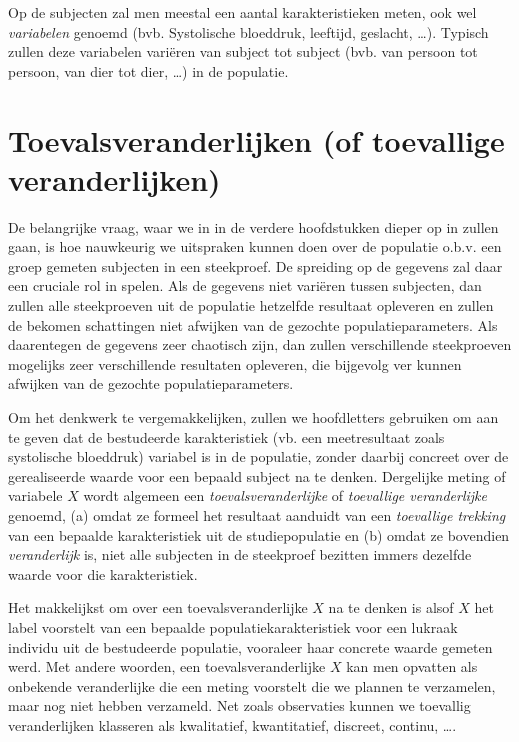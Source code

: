 \documentclass[12pt,dutch,coursenotes]{book}
\theoremstyle{definition}
\theoremstyle{definition}
\theoremstyle{definition}
\theoremstyle{remark}
\begin{document}
Op de subjecten zal men meestal een aantal karakteristieken meten, ook
wel \emph{variabelen} genoemd (bvb. Systolische bloeddruk, leeftijd,
geslacht, \ldots{}). Typisch zullen deze variabelen variëren van subject
tot subject (bvb. van persoon tot persoon, van dier tot dier, \ldots{})
in de populatie.

\section{Toevalsveranderlijken (of toevallige
veranderlijken)}\label{toevalsveranderlijken-of-toevallige-veranderlijken}

De belangrijke vraag, waar we in in de verdere hoofdstukken dieper op in
zullen gaan, is hoe nauwkeurig we uitspraken kunnen doen over de
populatie o.b.v. een groep gemeten subjecten in een steekproef. De
spreiding op de gegevens zal daar een cruciale rol in spelen. Als de
gegevens niet variëren tussen subjecten, dan zullen alle steekproeven
uit de populatie hetzelfde resultaat opleveren en zullen de bekomen
schattingen niet afwijken van de gezochte populatieparameters. Als
daarentegen de gegevens zeer chaotisch zijn, dan zullen verschillende
steekproeven mogelijks zeer verschillende resultaten opleveren, die
bijgevolg ver kunnen afwijken van de gezochte populatieparameters.

Om het denkwerk te vergemakkelijken, zullen we hoofdletters gebruiken om
aan te geven dat de bestudeerde karakteristiek (vb. een meetresultaat
zoals systolische bloeddruk) variabel is in de populatie, zonder daarbij
concreet over de gerealiseerde waarde voor een bepaald subject na te
denken. Dergelijke meting of variabele \(X\) wordt algemeen een
\emph{toevalsveranderlijke} of \emph{toevallige veranderlijke} genoemd,
(a) omdat ze formeel het resultaat aanduidt van een \emph{toevallige
trekking} van een bepaalde karakteristiek uit de studiepopulatie en (b)
omdat ze bovendien \emph{veranderlijk} is, niet alle subjecten in de
steekproef bezitten immers dezelfde waarde voor die karakteristiek.

Het makkelijkst om over een toevalsveranderlijke \(X\) na te denken is
alsof \(X\) het label voorstelt van een bepaalde populatiekarakteristiek
voor een lukraak individu uit de bestudeerde populatie, vooraleer haar
concrete waarde gemeten werd. Met andere woorden, een
toevalsveranderlijke \(X\) kan men opvatten als onbekende veranderlijke
die een meting voorstelt die we plannen te verzamelen, maar nog niet
hebben verzameld. Net zoals observaties kunnen we toevallig
veranderlijken klasseren als kwalitatief, kwantitatief, discreet,
continu, \ldots{}.
\end{document}
